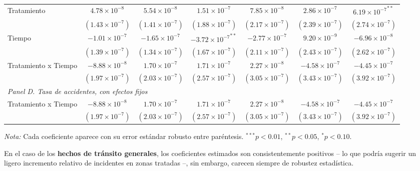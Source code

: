 \begin{table}[htbp]
\begin{adjustbox}{max width=\textwidth}
\begin{tabular}{lcccccc}
        Tratamiento & $4.78 \times 10^{-8}$ & $5.54 \times 10^{-8}$ & $1.51 \times 10^{-7}$ & $7.85 \times 10^{-8}$ & $2.86 \times 10^{-7}$ & ${6.19 \times 10^{-7}}^{**}$ \\
         & $(1.43 \times 10^{-7})$ & $(1.41 \times 10^{-7})$ & $(1.88 \times 10^{-7})$ & $(2.17 \times 10^{-7})$ & $(2.39 \times 10^{-7})$ & $(2.74 \times 10^{-7})$ \\
        Tiempo & $-1.01 \times 10^{-7}$ & $-1.65 \times 10^{-7}$ & ${-3.72 \times 10^{-7}}^{**}$ & $-2.77 \times 10^{-7}$ & $9.20 \times 10^{-9}$ & $-6.96 \times 10^{-8}$ \\
         & $(1.39 \times 10^{-7})$ & $(1.34 \times 10^{-7})$ & $(1.67 \times 10^{-7})$ & $(2.11 \times 10^{-7})$ & $(2.43 \times 10^{-7})$ & $(2.62 \times 10^{-7})$ \\
        Tratamiento x Tiempo & $-8.88 \times 10^{-8}$ & $1.70 \times 10^{-7}$ & $1.71 \times 10^{-7}$ & $2.27 \times 10^{-8}$ & $-4.58 \times 10^{-7}$ & $-4.45 \times 10^{-7}$ \\
         & $(1.97 \times 10^{-7})$ & $(2.03 \times 10^{-7})$ & $(2.57 \times 10^{-7})$ & $(3.05 \times 10^{-7})$ & $(3.43 \times 10^{-7})$ & $(3.92 \times 10^{-7})$ \\
        \midrule
        \multicolumn{7}{l}{\textit{Panel D. Tasa de accidentes, con efectos fijos}} \\
        Tratamiento x Tiempo & $-8.88 \times 10^{-8}$ & $1.70 \times 10^{-7}$ & $1.71 \times 10^{-7}$ & $2.27 \times 10^{-8}$ & $-4.58 \times 10^{-7}$ & $-4.45 \times 10^{-7}$ \\
         & $(1.97 \times 10^{-7})$ & $(2.03 \times 10^{-7})$ & $(2.57 \times 10^{-7})$ & $(3.05 \times 10^{-7})$ & $(3.43 \times 10^{-7})$ & $(3.92 \times 10^{-7})$ \\
        \bottomrule
    \end{tabular}
    \end{adjustbox}

    \vspace{0.4em}
    \begin{minipage}{0.93\textwidth}
        \tiny \textit{Nota:} Cada coeficiente aparece con su error estándar robusto entre paréntesis. ${}^{***} p<0.01$, ${}^{**} p<0.05$, ${}^{*} p<0.10$.
    \end{minipage}
\end{table}


En el caso de los \textbf{hechos de tránsito generales}, los coeficientes estimados son consistentemente positivos -- lo que podría sugerir un ligero incremento relativo de incidentes en zonas tratadas --, sin embargo, carecen siempre de robustez estadística. 

